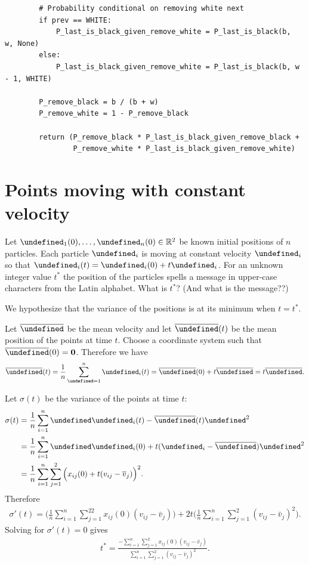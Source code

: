 \documentclass[12pt]{article}
\begin{document}
\begin{enumerate}
\begin{verbatim}
        # Probability conditional on removing white next
        if prev == WHITE:
            P_last_is_black_given_remove_white = P_last_is_black(b,     w, None)
        else:
            P_last_is_black_given_remove_white = P_last_is_black(b, w - 1, WHITE)

        P_remove_black = b / (b + w)
        P_remove_white = 1 - P_remove_black

        return (P_remove_black * P_last_is_black_given_remove_black +
                P_remove_white * P_last_is_black_given_remove_white)
\end{verbatim}
\end{enumerate}
\section{Points moving with constant velocity}

\let\x\undefined
\let\v\undefined
\let\A\undefined
\let\B\undefined
\let\|\undefined
\newcommand{\|}{\Big|\Big|}
\newcommand{\x}{\vec x}
\newcommand{\v}{\vec v}
\newcommand{\A}{\vec A}
\newcommand{\B}{\vec B}

\begin{mdframed}
  Let $\x_1(0), \ldots, \x_n(0) \in \R^2$ be known initial positions of $n$ particles. Each particle
  $\x_i$ is moving at constant velocity $\v_i$ so that $\x_i(t) = \x_i(0) + t\v_i$. For an unknown
  integer value $t^*$ the position of the particles spells a message in upper-case characters from
  the Latin alphabet. What is $t^*$? (And what is the message??)
\end{mdframed}

We hypothesize that the variance of the positions is at its minimum when $t=t^*$.

Let $\bar \v$ be the mean velocity and let $\bar \x(t)$ be the mean position of the points at time
$t$. Choose a coordinate system such that $\bar \x(0) = \0$. Therefore we have
\begin{align*}
  \bar \x(t) = \frac{1}{n}\sum_{\x=1}^n \x_i(t)
             = \bar \x(0) + t\bar \v
             = t\bar \v.
\end{align*}

Let $\sigma(t)$ be the variance of the points at time $t$:
\begin{align*}
  \sigma(t) &= \frac{1}{n}\sum_{i=1}^n\|\x_i(t) - \bar \x(t)\|^2\\
            &= \frac{1}{n}\sum_{i=1}^n\|\x_i(0) + t(\v_i - \bar \v)\|^2\\
            &= \frac{1}{n}\sum_{i=1}^n\sum_{j=1}^2\Big(x_{ij}(0) + t(v_{ij} - \bar v_j)\Big)^2.
\end{align*}
Therefore
\begin{align*}
  \sigma'(t) = \Bigg(\frac{1}{n}\sum_{i=1}^n\sum_{j=1}^22x_{ij}(0)(v_{ij} - \bar v_j)\Bigg) +
              2t\Bigg(\frac{1}{n}\sum_{i=1}^n\sum_{j=1}^2(v_{ij} - \bar v_j)^2\Bigg).
\end{align*}
Solving for $\sigma'(t) = 0$ gives
\begin{align*}
  t^* = \frac{-\sum_{i=1}^n\sum_{j=1}^2x_{ij}(0)(v_{ij} - \bar v_j)}
             {\sum_{i=1}^n\sum_{j=1}^2(v_{ij} - \bar v_j)^2}.
\end{align*}
\end{document}
